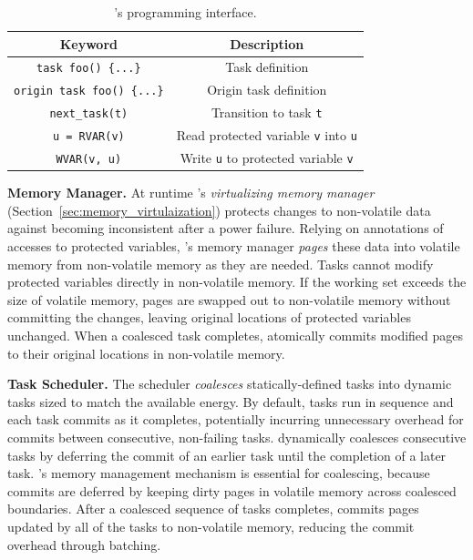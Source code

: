 \begin{table}
	\centering
	\footnotesize
	\begin{tabular}{|c|c|}
		\hline
		\textbf{Keyword} & \textbf{Description} \\
		\hline\hline
		\texttt{task foo() \{...\}} & Task definition\\
		\texttt{origin task foo() \{...\}} & Origin task definition\\
		\texttt{next\_task(t)} & Transition to task \texttt{t}\\
		\texttt{u = RVAR(v)} & Read protected variable \texttt{v} into \texttt{u}\\
		\texttt{WVAR(v, u)} & Write \texttt{u} to protected variable \texttt{v}\\
		\hline
	\end{tabular}
	\caption{\sys's programming interface.}
	\label{tab:viper_syntax}
\end{table}

\textbf{\sys Memory Manager.} At runtime \sys's \emph{virtualizing memory
manager} (Section~\ref{sec:memory_virtulaization}) protects changes to
non-volatile data against becoming inconsistent after a power failure.  Relying
on annotations of accesses to protected variables, \sys's memory manager {\em
pages} these data into volatile memory from non-volatile memory as they are
needed.  Tasks cannot modify protected variables directly in non-volatile
memory.  If the working set exceeds the size of volatile memory, pages are
swapped out to non-volatile memory without committing the changes, leaving
original locations of protected variables unchanged.  When a coalesced task
completes, \sys atomically commits modified pages to their original locations
in non-volatile memory.

\textbf{\sys Task Scheduler.} The scheduler {\em coalesces}
statically\hyp{}defined tasks into dynamic tasks sized to match the available
energy. By default, tasks run in sequence and each task commits as it
completes, potentially incurring unnecessary overhead for commits between
consecutive, non-failing tasks. \sys dynamically coalesces consecutive tasks by
deferring the commit of an earlier task until the completion of a later task.
\sys's memory management mechanism is essential for coalescing, because commits
are deferred by keeping dirty pages in volatile memory across coalesced
boundaries.  After a coalesced sequence of tasks completes, \sys commits pages
updated by all of the tasks to non-volatile memory, reducing the commit
overhead through batching.
